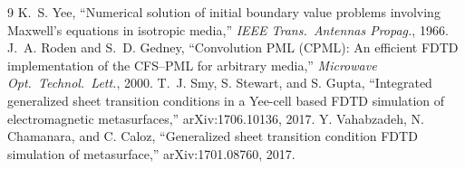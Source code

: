 \documentclass[11pt,a4paper]{article}
\numberwithin{equation}{section}
\begin{document}
\begin{thebibliography}{9}
K.~S. Yee, ``Numerical solution of initial boundary value problems involving
Maxwell's equations in isotropic media,'' \emph{IEEE Trans.\ Antennas
Propag.}, 1966.
J.~A. Roden and S.~D. Gedney, ``Convolution PML (CPML): An efficient FDTD
implementation of the CFS--PML for arbitrary media,'' \emph{Microwave Opt.\
Technol.\ Lett.}, 2000.
T.~J. Smy, S. Stewart, and S. Gupta, ``Integrated generalized sheet transition
conditions in a Yee-cell based FDTD simulation of electromagnetic
metasurfaces,'' arXiv:1706.10136, 2017.
Y. Vahabzadeh, N. Chamanara, and C. Caloz, ``Generalized sheet transition
condition FDTD simulation of metasurface,'' arXiv:1701.08760, 2017.
\end{thebibliography}
\end{document}
